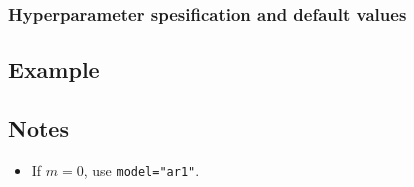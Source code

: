 \documentclass[a4paper,11pt]{article}
\begin{document}
\subsubsection*{Hyperparameter spesification and default values}


\subsection*{Example}



\subsection*{Notes}

\begin{itemize}
\item If $m = 0$, use \texttt{model="ar1"}. 
\end{itemize}
\end{document}
